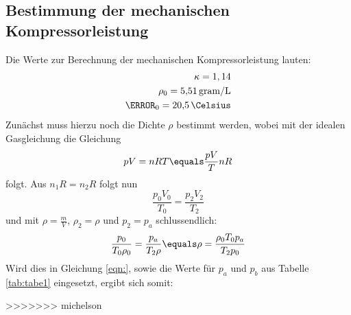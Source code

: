 \subsection{Bestimmung der mechanischen Kompressorleistung}
Die Werte zur Berechnung der mechanischen Kompressorleistung lauten:
\begin{align*}
  \kappa = 1,14 \\
  \rho_0 = \SI{5.51}{gram\per\liter} \\
  \T_0 = \SI{20.5}{\Celsius}
\end{align*}
Zunächst muss hierzu noch die Dichte $\rho$ bestimmt werden, wobei mit der idealen Gasgleichung
die Gleichung
\begin{equation}
  pV =nRT \equals \frac{pV}{T}{nR}
\end{equation}
folgt. Aus $n_1R =n_2R$ folgt nun
\begin{equation}
  \frac{p_0 V_0}{T_0} = \frac{p_2 V_2}{T_2}
\end{equation}
und mit $\rho = \frac{m}{V}$, $\rho_2=\rho$ und $p_2 =p_a$ schlussendlich:
\begin{equation}
  \frac{p_0}{T_0\rho_0} = \frac{p_a}{T_2 \rho} \equals \rho = \frac{\rho_0 T_0 p_a}{T_2p_0}
\end{equation}
Wird dies in Gleichung \ref{eqn:}, sowie die Werte für $p_a$ und $p_b$ aus Tabelle
\ref{tab:tabe1} eingesetzt, ergibt sich somit:

>>>>>>> michelson
